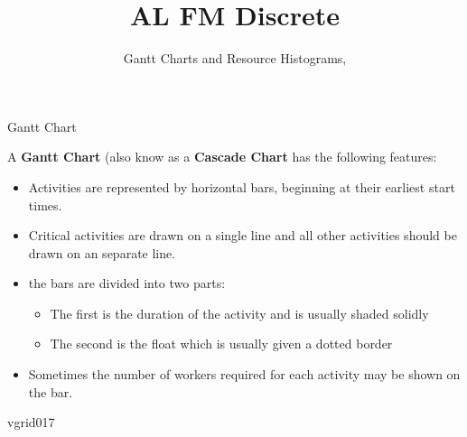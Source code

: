 \documentclass[8pt]{beamer}
\title[Discrete]{{\color{aa}\Huge\adfbullet{9}}AL FM Discrete}
\subtitle{Gantt Charts and Resource Histograms, \textattachfile{GanttChartsandResourceHistograms.tex}{(TeX)}}
\begin{document}
\setlength{\abovedisplayskip}{0pt}
\setlength{\belowdisplayskip}{0pt}
\setlength{\abovedisplayshortskip}{0pt}
\setlength{\belowdisplayshortskip}{0pt}


\frame{\titlepage}

\begin{frame}[shrink=5]{Gantt Chart}
	\begin{definition}
		A \textbf{Gantt Chart} (also know as a \textbf{Cascade Chart} has the following features:
		\begin{itemize}
			\item Activities are represented by horizontal bars, beginning at their earliest start times.
			\item Critical activities are drawn on a single line and all other activities should be drawn on an separate line.
			\item the bars are divided into two parts:
				\begin{itemize}
					\item The first is the duration of the activity and is usually shaded solidly
					\item The second is the float which is usually given a dotted border
						
				\end{itemize}
			\item Sometimes the number of workers required for each activity may be shown on the bar.
		\end{itemize}
	\end{definition}

\centering
	\begin{gantt}{vgrid}{0}{17}
	 \\
	 \\
	 \\
	 \\
	 \\
\end{gantt}

\end{frame}
\end{document}
